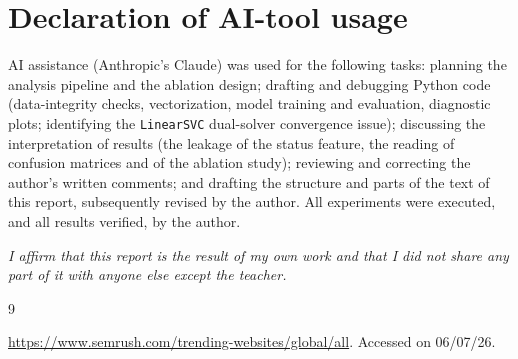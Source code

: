 \documentclass[11pt,a4paper]{article}
\begin{document}
\section*{Declaration of AI-tool usage}
AI assistance (Anthropic's Claude) was used for the following tasks:
planning the analysis pipeline and the ablation design; drafting and
debugging Python code (data-integrity checks, vectorization, model training
and evaluation, diagnostic plots; identifying the \texttt{LinearSVC}
dual-solver convergence issue); discussing the interpretation of results
(the leakage of the status feature, the reading of confusion matrices and
of the ablation study); reviewing and correcting the author's written
comments; and drafting the structure and parts of the text of this report,
subsequently revised by the author. All experiments were executed, and all
results verified, by the author.
 
\bigskip
\noindent\textit{I affirm that this report is the result of my own work and
that I did not share any part of it with anyone else except the teacher.}


\begin{thebibliography}{9}
 
\newblock \url{https://www.semrush.com/trending-websites/global/all}.
\newblock Accessed on 06/07/26.
 
\end{thebibliography}
\end{document}
